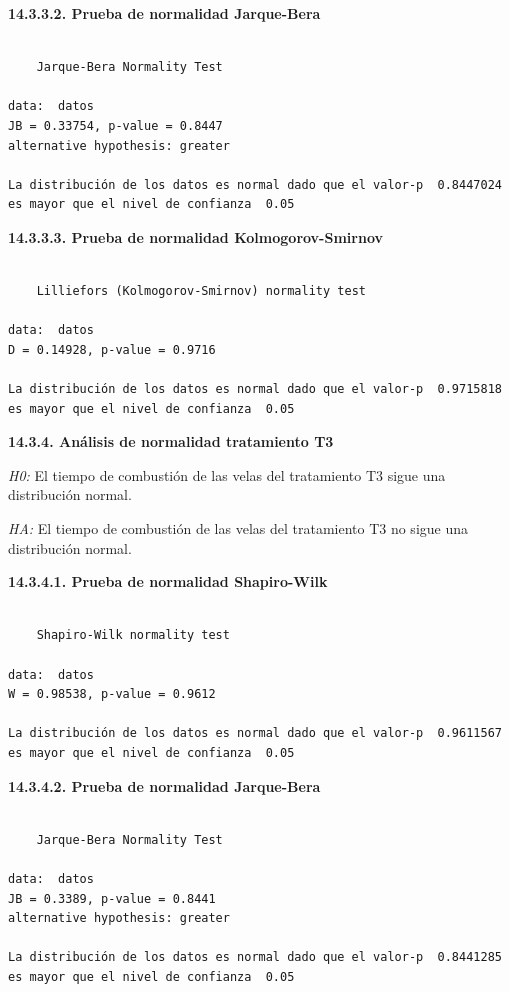 \documentclass[
  letterpaper,
  DIV=11,
  numbers=noendperiod]{scrartcl}
\begin{document}
\textbf{14.3.3.2. Prueba de normalidad Jarque-Bera}

\begin{verbatim}

    Jarque-Bera Normality Test

data:  datos
JB = 0.33754, p-value = 0.8447
alternative hypothesis: greater

La distribución de los datos es normal dado que el valor-p  0.8447024  es mayor que el nivel de confianza  0.05
\end{verbatim}

\textbf{14.3.3.3. Prueba de normalidad Kolmogorov-Smirnov}

\begin{verbatim}

    Lilliefors (Kolmogorov-Smirnov) normality test

data:  datos
D = 0.14928, p-value = 0.9716

La distribución de los datos es normal dado que el valor-p  0.9715818  es mayor que el nivel de confianza  0.05
\end{verbatim}

\textbf{14.3.4. Análisis de normalidad tratamiento T3}

\emph{H0:} El tiempo de combustión de las velas del tratamiento T3 sigue
una distribución normal.

\emph{HA:} El tiempo de combustión de las velas del tratamiento T3 no
sigue una distribución normal.

\textbf{14.3.4.1. Prueba de normalidad Shapiro-Wilk}

\begin{verbatim}

    Shapiro-Wilk normality test

data:  datos
W = 0.98538, p-value = 0.9612

La distribución de los datos es normal dado que el valor-p  0.9611567  es mayor que el nivel de confianza  0.05
\end{verbatim}

\textbf{14.3.4.2. Prueba de normalidad Jarque-Bera}

\begin{verbatim}

    Jarque-Bera Normality Test

data:  datos
JB = 0.3389, p-value = 0.8441
alternative hypothesis: greater

La distribución de los datos es normal dado que el valor-p  0.8441285  es mayor que el nivel de confianza  0.05
\end{verbatim}
\end{document}
